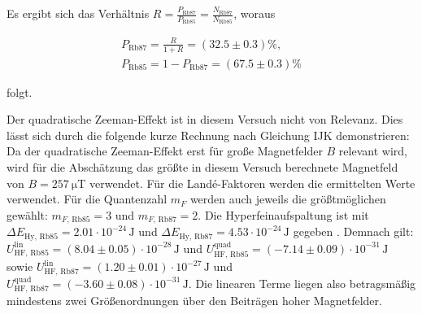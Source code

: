 Es ergibt sich das Verhältnis $R = \frac{P_{\text{Rb}87}}{P_{\text{Rb}85}} = \frac{N_{\text{Rb}87}}{N_{\text{Rb}85}}$, woraus

\begin{eqnarray}
	P_{\text{Rb}87} = \frac{R}{1 + R} = (32.5 \pm 0.3) \%, \\
	P_{\text{Rb}85} = 1 - P_{\text{Rb}87} = (67.5 \pm 0.3) \%
\end{eqnarray}

folgt.

Der quadratische Zeeman-Effekt ist in diesem Versuch nicht von Relevanz. Dies lässt sich 
durch die folgende kurze Rechnung nach Gleichung IJK demonstrieren: Da der quadratische 
Zeeman-Effekt erst für große Magnetfelder $B$ relevant wird, wird für die Abschätzung das 
größte in diesem Versuch berechnete Magnetfeld von $B = \SI{257}{\micro \tesla}$ verwendet. Für die 
Landé-Faktoren werden die ermittelten Werte verwendet. Für die Quantenzahl $m_F$ werden auch
 jeweils die größtmöglichen gewählt: $m_{F, \, \text{Rb}85} = 3$ und $m_{F, \, \text{Rb}87} = 2$.
  Die Hyperfeinaufspaltung ist mit $\Delta E_{\text{Hy}, \, \text{Rb}85} = {2.01 \cdot 10^{-24}}\, \text{J}$ und
   $\Delta E_{\text{Hy}, \, \text{Rb}87} = {4.53 \cdot 10^{-24}}\, \text{J}$ gegeben \cite{V21}.
   Demnach gilt: 
    $U_{\text{HF}, \, \text{Rb}85}^\text{lin} = {(8.04 \pm 0.05) \cdot 10^{-28}}\, \text{J}$ und 
    $U_{\text{HF}, \, \text{Rb}85}^\text{quad} = {(-7.14 \pm 0.09) \cdot 10^{-31}}\, \text{J}$ sowie
     $U_{\text{HF}, \, \text{Rb}87}^\text{lin} = {(1.20 \pm 0.01) \cdot 10^{-27}}\, \text{J}$ und
     $U_{\text{HF}, \, \text{Rb}87}^\text{quad} = {(-3.60 \pm 0.08) \cdot 10^{-31}}\, \text{J}$. 
     Die linearen Terme liegen also betragsmäßig mindestens zwei Größenordnungen über den Beiträgen hoher Magnetfelder. 